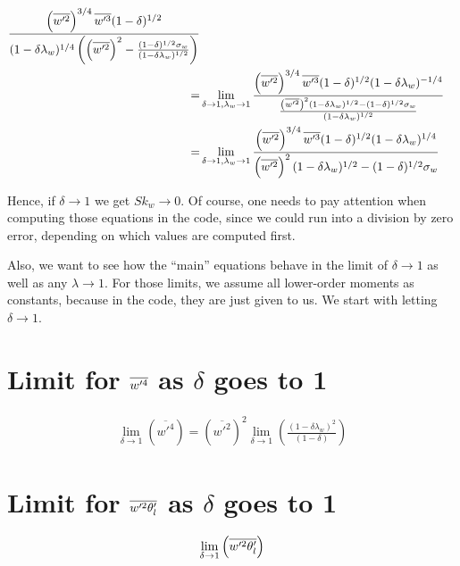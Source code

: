\begin{align}
    \frac{
        \left(\overline{w'^2}\right)^{3/4} \overline{w'^3} (1-\delta)^{1/2}
    }
    {
        (1-\delta \lambda_w)^{1/4}
        \left(
        \left(\overline{w'^2}\right)^2 -
        \frac{(1-\delta)^{1/2} \sigma_w}{(1-\delta \lambda_w)^{1/2}}
        \right)
    }
    \nonumber\\
    =&\lim_{\delta \to 1, \lambda_w \to 1}
    \frac{
        \left(\overline{w'^2}\right)^{3/4} \overline{w'^3} (1-\delta)^{1/2} (1-\delta \lambda_w)^{-1/4}
    }
    {
        \frac{\left(\overline{w'^2}\right)^2 (1-\delta \lambda_w)^{1/2}
            - (1-\delta)^{1/2} \sigma_w}{(1-\delta \lambda_w)^{1/2}}
    }
    \nonumber\\
    =&\lim_{\delta \to 1, \lambda_w \to 1}
    \frac{
        \left(\overline{w'^2}\right)^{3/4} \overline{w'^3} (1-\delta)^{1/2} (1-\delta \lambda_w)^{1/4}
    }
    {
        \left(\overline{w'^2}\right)^2 (1-\delta \lambda_w)^{1/2}
        - (1-\delta)^{1/2} \sigma_w
    }
\end{align}

Hence, if $\delta \to 1$ we get $Sk_w \to 0$.
Of course, one needs to pay attention when computing those equations in the code,
since we could run into a division by zero error,
depending on which values are computed first.

Also, we want to see how the \enquote{main} equations behave in the limit of $\delta \to 1$ as well as any $\lambda \to 1$.
For those limits, we assume all lower-order moments as constants, because in the code, they are just given to us.
We start with letting $\delta \to 1$.

\section{Limit for \texorpdfstring{$\overline{w'^4}$}{wprime4bar} as \texorpdfstring{$\delta$}{delta} goes to 1}
\label{sec:limit-for-wprime4bar-as-delta-goes-to-1}

\begin{align}
    \label{eq:limit_wprime4_delta_to_1}
    \lim_{\delta \to 1}\left(\overline{w'^4}\right)
    = \left(\overline{w'^2}\right)^2
    \lim_{\delta \to 1}
    \left(\frac{
        \left(1-\delta\lambda_w\right)^2
    }{(1-\delta)}
    \right)
\end{align}

\section{Limit for \texorpdfstring{$\overline{w'^2 \theta_l'}$}{wprime2thetalbar} as \texorpdfstring{$\delta$}{delta} goes to 1}
\label{sec:limit-for-wprime2thetalbar-as-delta-goes-to-1}

\begin{align}
    \label{eq:limit_wprime2thetalbar_delta_to_1}
    \lim_{\delta \to 1}\left(\overline{w'^2 \theta_l'}\right)
\end{align}